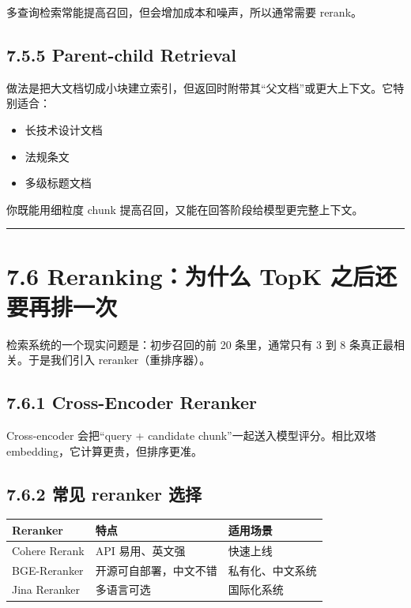 多查询检索常能提高召回，但会增加成本和噪声，所以通常需要 rerank。


\subsection{7.5.5 Parent-child Retrieval}

做法是把大文档切成小块建立索引，但返回时附带其``父文档''或更大上下文。它特别适合：


\begin{itemize}[leftmargin=2em]
\item 长技术设计文档
\item 法规条文
\item 多级标题文档
\end{itemize}

你既能用细粒度 chunk 提高召回，又能在回答阶段给模型更完整上下文。


\bigskip\hrule\bigskip

\section{7.6 Reranking：为什么 TopK 之后还要再排一次}

检索系统的一个现实问题是：初步召回的前 20 条里，通常只有 3 到 8 条真正最相关。于是我们引入 reranker（重排序器）。


\subsection{7.6.1 Cross-Encoder Reranker}

Cross-encoder 会把``query + candidate chunk''一起送入模型评分。相比双塔 embedding，它计算更贵，但排序更准。


\subsection{7.6.2 常见 reranker 选择}

\begingroup
\scriptsize
\setlength{\tabcolsep}{3pt}
\begin{longtable}{|p{}|p{}|p{}|}
\hline
Reranker & 特点 & 适用场景 \\ \hline
Cohere Rerank & API 易用、英文强 & 快速上线 \\ \hline
BGE-Reranker & 开源可自部署，中文不错 & 私有化、中文系统 \\ \hline
Jina Reranker & 多语言可选 & 国际化系统 \\ \hline
\end{longtable}
\endgroup

